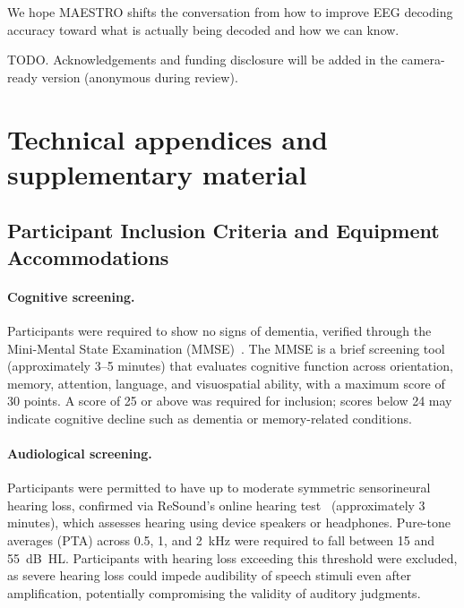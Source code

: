 \documentclass{article}
\begin{document}
We hope MAESTRO shifts the conversation from how to improve EEG decoding 
accuracy toward what is actually being decoded and how we can know.

\begin{ack}
TODO. Acknowledgements and funding disclosure will be added in the camera-ready version (anonymous during review).
\end{ack}




\appendix

\section{Technical appendices and supplementary material}

\subsection{Participant Inclusion Criteria and Equipment Accommodations}
\label{app:participants}

\paragraph{Cognitive screening.} Participants were required to show no signs of dementia, verified through the Mini-Mental State Examination (MMSE)~\cite{folstein1975mini}. The MMSE is a brief screening tool (approximately 3--5 minutes) that evaluates cognitive function across orientation, memory, attention, language, and visuospatial ability, with a maximum score of 30 points. A score of 25 or above was required for inclusion; scores below 24 may indicate cognitive decline such as dementia or memory-related conditions.

\paragraph{Audiological screening.} Participants were permitted to have up to moderate symmetric sensorineural hearing loss, confirmed via ReSound's online hearing test~\cite{resound_hearing_test} (approximately 3 minutes), which assesses hearing using device speakers or headphones. Pure-tone averages (PTA) across 0.5, 1, and 2~kHz were required to fall between 15 and 55~dB~HL. Participants with hearing loss exceeding this threshold were excluded, as severe hearing loss could impede audibility of speech stimuli even after amplification, potentially compromising the validity of auditory judgments.
\end{document}
